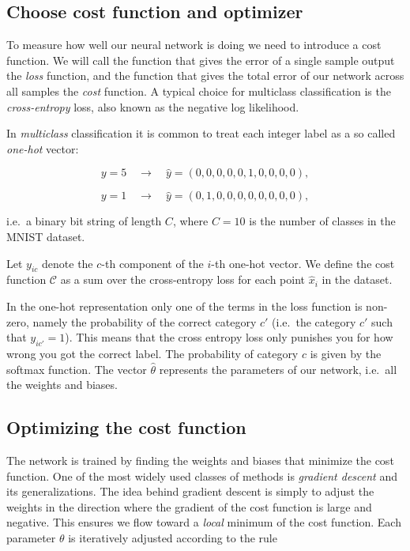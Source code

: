 \documentclass[%
oneside,                 %
final,                   %
10pt]{article}
\begin{document}
\subsection*{Choose cost function and optimizer}

To measure how well our neural network is doing we need to introduce a cost function.  
We will call the function that gives the error of a single sample output the \emph{loss} function, and the function
that gives the total error of our network across all samples the \emph{cost} function.
A typical choice for multiclass classification is the \emph{cross-entropy} loss, also known as the negative log likelihood.  

In \emph{multiclass} classification it is common to treat each integer label as a so called \emph{one-hot} vector:  

$$ y = 5 \quad \rightarrow \quad \hat{y} = (0, 0, 0, 0, 0, 1, 0, 0, 0, 0) ,$$  


$$ y = 1 \quad \rightarrow \quad \hat{y} = (0, 1, 0, 0, 0, 0, 0, 0, 0, 0) ,$$  


i.e.~a binary bit string of length $C$, where $C = 10$ is the number of classes in the MNIST dataset.  

Let $y_{ic}$ denote the $c$-th component of the $i$-th one-hot vector.  
We define the cost function $\mathcal{C}$ as a sum over the cross-entropy loss for each point $\hat{x}_i$ in the dataset.

In the one-hot representation only one of the terms in the loss function is non-zero, namely the
probability of the correct category $c'$  
(i.e.~the category $c'$ such that $y_{ic'} = 1$). This means that the cross entropy loss only punishes you for how wrong
you got the correct label. The probability of category $c$ is given by the softmax function. The vector $\hat{\theta}$ represents the parameters of our network, i.e.~all the weights and biases.  


\subsection*{Optimizing the cost function}

The network is trained by finding the weights and biases that minimize the cost function. One of the most widely used classes of methods is \emph{gradient descent} and its generalizations. The idea behind gradient descent
is simply to adjust the weights in the direction where the gradient of the cost function is large and negative. This ensures we flow toward a \emph{local} minimum of the cost function.  
Each parameter $\theta$ is iteratively adjusted according to the rule  
\end{document}
